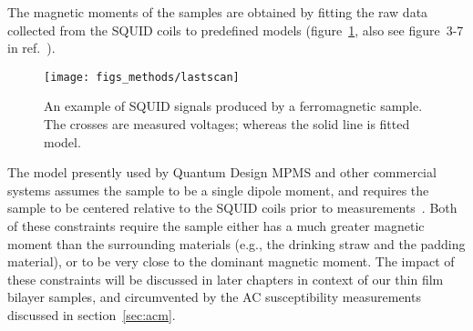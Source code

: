 The magnetic moments of the samples are obtained by fitting the raw data collected from the SQUID coils to predefined models (figure~\ref{fig:lastscan}, also see figure~3-7 in ref.~\cite{mpms_software}). %
\begin{figure}[ht]%
	\centering%
    \texttt{[image: figs\_methods/lastscan]}%
    \caption[An example of SQUID signals.]{\label{fig:lastscan}An example of SQUID signals produced by a ferromagnetic sample. The crosses are measured voltages; whereas the solid line is fitted model.}%
\end{figure}%
The model presently used by Quantum Design MPMS and other commercial systems assumes the sample to be a single dipole moment, and requires the sample to be centered relative to the SQUID coils prior to measurements~\cite{mpms_software, squid_bg, squid_center_error}. Both of these constraints require the sample either has a much greater magnetic moment than the surrounding materials (e.g., the drinking straw and the padding material), or to be very close to the dominant magnetic moment. The impact of these constraints will be discussed in later chapters in context of our thin film bilayer samples, and circumvented by the AC susceptibility measurements discussed in section~\ref{sec:acm}.
